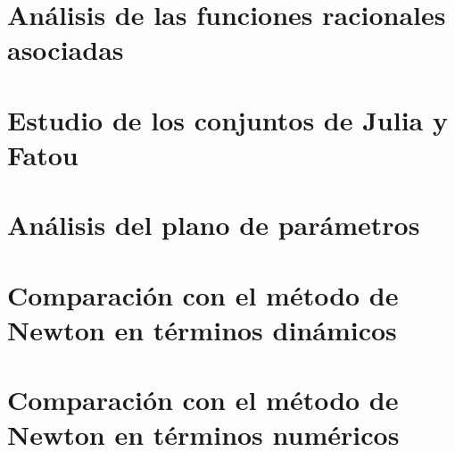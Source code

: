 \section{Análisis de las funciones racionales asociadas}
\section{Estudio de los conjuntos de Julia y Fatou}
\section{Análisis del plano de parámetros}
\section{Comparación con el método de Newton en términos dinámicos}
\section{Comparación con el método de Newton en términos numéricos}
